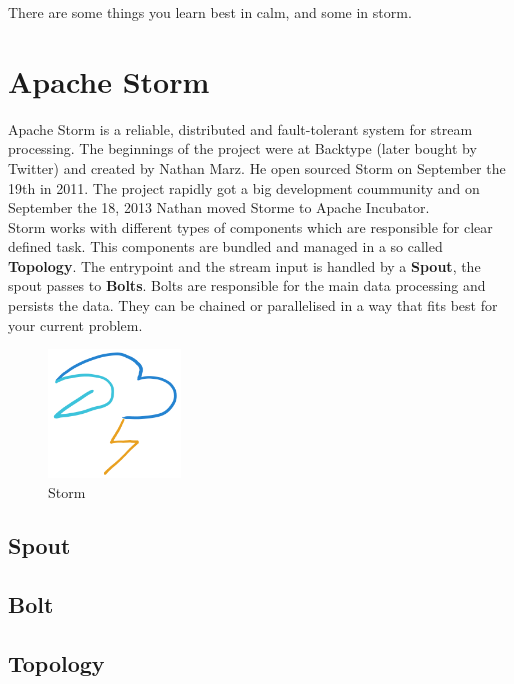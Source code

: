 \begin{savequote}[75mm]
There are some things you learn best in calm, and some in storm.
\end{savequote}

\chapter{Apache Storm}

Apache Storm is a reliable, distributed and fault-tolerant system for stream processing.
The beginnings of the project were at Backtype (later bought by Twitter) and created by Nathan Marz.
He open sourced Storm on September the 19th in 2011. The project rapidly got a big development coummunity and
on September the 18, 2013 Nathan moved Storme to Apache Incubator.\\

Storm works with different types of components which are responsible for clear defined task.
This components are bundled and managed in a so called \textbf{Topology}.
The entrypoint and the stream input is handled by a \textbf{Spout}, the spout passes to \textbf{Bolts}.
Bolts are responsible for the main data processing and persists the data.
They can be chained or parallelised in a way that fits best for your current problem.

\begin{figure}[hp]
\centering
\captionsetup{justification=centering}
\includegraphics[width=100pt]{images/storm.png}
\caption[Storm]{Storm}
\end{figure}
\newpage

\section{Spout}


\newpage

\section{Bolt}

\newpage

\section{Topology}